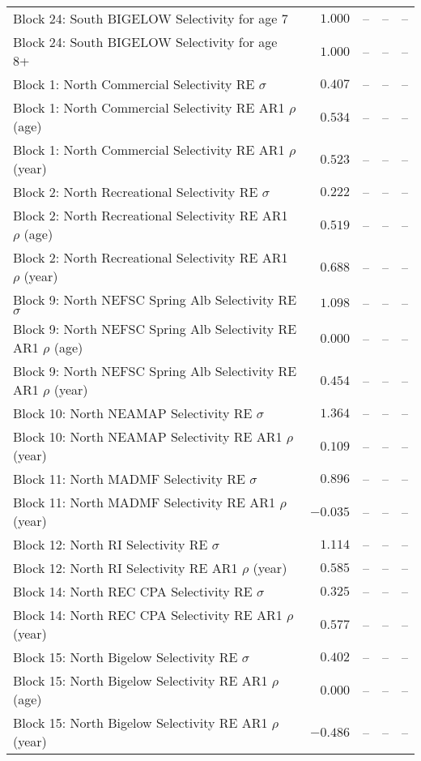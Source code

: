 \documentclass[
]{article}
\begin{document}
\begin{landscape}
\begin{longtable}[t]{lrrrr}
Block 24: South BIGELOW Selectivity for age 7 & $1.000$ & -- & -- & --\\
Block 24: South BIGELOW Selectivity for age 8+ & $1.000$ & -- & -- & --\\
Block 1: North Commercial Selectivity RE $\sigma$ & $0.407$ & -- & -- & --\\
\addlinespace
Block 1: North Commercial Selectivity RE AR1 $\rho$ (age) & $0.534$ & -- & -- & --\\
Block 1: North Commercial Selectivity RE AR1 $\rho$ (year) & $0.523$ & -- & -- & --\\
Block 2: North Recreational Selectivity RE $\sigma$ & $0.222$ & -- & -- & --\\
Block 2: North Recreational Selectivity RE AR1 $\rho$ (age) & $0.519$ & -- & -- & --\\
Block 2: North Recreational Selectivity RE AR1 $\rho$ (year) & $0.688$ & -- & -- & --\\
\addlinespace
Block 9: North NEFSC Spring Alb Selectivity RE $\sigma$ & $1.098$ & -- & -- & --\\
Block 9: North NEFSC Spring Alb Selectivity RE AR1 $\rho$ (age) & $0.000$ & -- & -- & --\\
Block 9: North NEFSC Spring Alb Selectivity RE AR1 $\rho$ (year) & $0.454$ & -- & -- & --\\
Block 10: North NEAMAP Selectivity RE $\sigma$ & $1.364$ & -- & -- & --\\
Block 10: North NEAMAP Selectivity RE AR1 $\rho$ (year) & $0.109$ & -- & -- & --\\
\addlinespace
Block 11: North MADMF Selectivity RE $\sigma$ & $0.896$ & -- & -- & --\\
Block 11: North MADMF Selectivity RE AR1 $\rho$ (year) & $-0.035$ & -- & -- & --\\
Block 12: North RI Selectivity RE $\sigma$ & $1.114$ & -- & -- & --\\
Block 12: North RI Selectivity RE AR1 $\rho$ (year) & $0.585$ & -- & -- & --\\
Block 14: North REC CPA Selectivity RE $\sigma$ & $0.325$ & -- & -- & --\\
\addlinespace
Block 14: North REC CPA Selectivity RE AR1 $\rho$ (year) & $0.577$ & -- & -- & --\\
Block 15: North Bigelow Selectivity RE $\sigma$ & $0.402$ & -- & -- & --\\
Block 15: North Bigelow Selectivity RE AR1 $\rho$ (age) & $0.000$ & -- & -- & --\\
Block 15: North Bigelow Selectivity RE AR1 $\rho$ (year) & $-0.486$ & -- & -- & --\\

\end{longtable}
\end{landscape}
\end{document}
